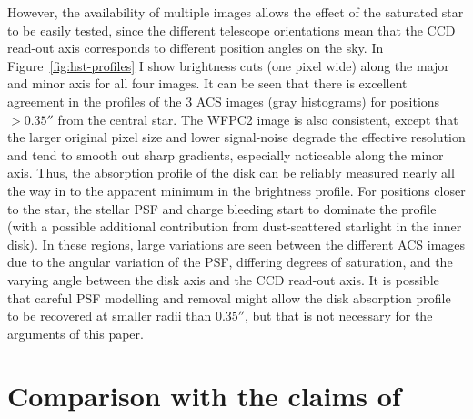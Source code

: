\documentclass[oneside, 11pt]{article}
\begin{document}
However, the availability of multiple images allows the effect of the saturated star to be easily tested, since the different telescope orientations mean that the CCD read-out axis corresponds to different position angles on the sky.   In Figure~\ref{fig:hst-profiles} I show brightness cuts (one pixel wide) along the major and minor axis for all four images.   It can be seen that there is excellent agreement in the profiles of the 3 ACS images (gray histograms) for positions \(> 0.35''\) from the central star.   The WFPC2 image is also consistent, except that the larger original pixel size and lower signal-noise degrade the effective resolution and tend to smooth out sharp gradients, especially noticeable along the minor axis.    Thus, the absorption profile of the disk can be reliably measured nearly all the way in to the apparent minimum in the brightness profile.   For positions closer to the star, the stellar PSF and charge bleeding start to dominate the profile (with a possible additional contribution from dust-scattered starlight in the inner disk).  In these regions, large variations are seen between the different ACS images due to the angular variation of the PSF, differing degrees of saturation, and the varying angle between the disk axis and the CCD read-out axis.   It is possible that careful PSF modelling and removal might allow the disk absorption profile to be recovered at smaller radii than \(0.35''\), but that is not necessary for the arguments of this paper.  

\section{Comparison with the claims of \citeauthor{Follette:2013a}}
\label{sec:comp}
\end{document}
